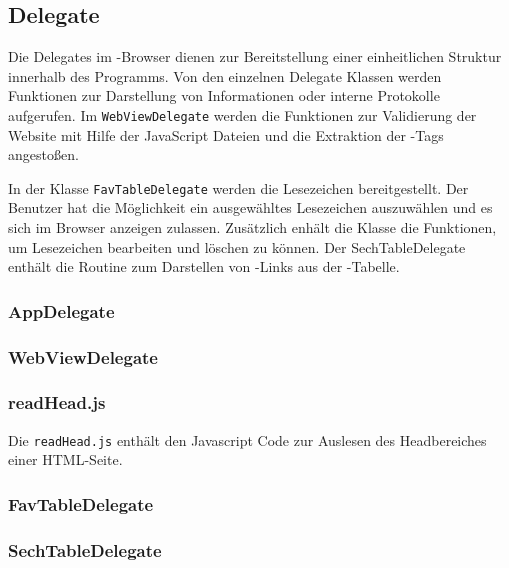 \subsection{Delegate}

Die Delegates im \SECH-Browser dienen zur Bereitstellung einer einheitlichen Struktur innerhalb des Programms. Von den einzelnen Delegate Klassen werden Funktionen zur Darstellung von Informationen oder interne Protokolle aufgerufen. Im \lstinline|WebViewDelegate| werden die Funktionen zur Validierung der Website mit Hilfe der JavaScript Dateien und die Extraktion der \SEARCH-Tags angestoßen.

 In der Klasse \lstinline|FavTableDelegate| werden die Lesezeichen bereitgestellt. Der Benutzer hat die Möglichkeit ein ausgewähltes Lesezeichen auszuwählen und es sich im Browser anzeigen zulassen. Zusätzlich enhält die Klasse die Funktionen, um Lesezeichen bearbeiten und löschen zu können. Der SechTableDelegate enthält die Routine zum Darstellen von \SEARCH-Links aus der \SECH-Tabelle. 
\subsubsection{AppDelegate}
\subsubsection{WebViewDelegate}
\subsubsection{readHead.js}
Die \lstinline|readHead.js| enthält den Javascript Code zur Auslesen des Headbereiches einer HTML-Seite.
\subsubsection{FavTableDelegate}
\subsubsection{SechTableDelegate}

